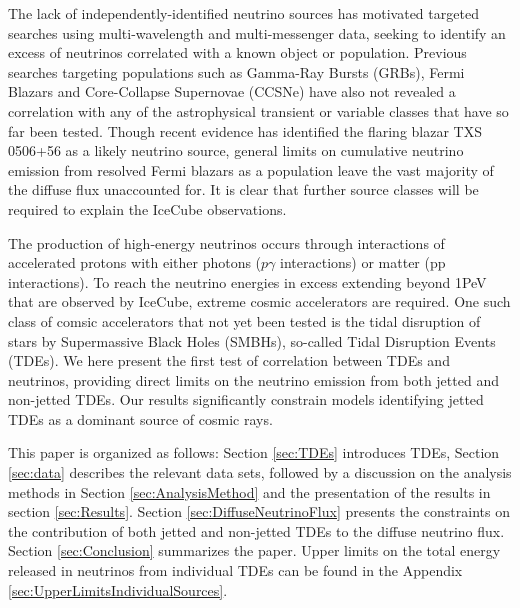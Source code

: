 \documentclass[twocolumn, tighten, linenumbers]{aastex62}
\begin{document}
The lack of independently-identified neutrino sources has motivated targeted searches using multi-wavelength and multi-messenger data, seeking to identify an excess of neutrinos correlated with a known object or population. Previous searches targeting populations such as Gamma-Ray Bursts (GRBs), Fermi Blazars and Core-Collapse Supernovae (CCSNe) have also not revealed a correlation with any of the astrophysical transient or variable classes that have so far been tested. Though recent evidence has identified the flaring blazar TXS 0506+56 as a likely neutrino source, general limits on cumulative neutrino emission from resolved Fermi blazars as a population leave the vast majority of the diffuse flux unaccounted for. It is clear that further source classes will be required to explain the IceCube observations.

The production of high-energy neutrinos occurs through interactions of accelerated protons with either photons ($p\gamma$ interactions) or matter (pp interactions). To reach the neutrino energies in excess extending beyond 1PeV that are observed by IceCube, extreme cosmic accelerators are required. One such class of comsic accelerators that not yet been tested is the tidal disruption of stars by Supermassive Black Holes (SMBHs), so-called Tidal Disruption Events (TDEs). We here present the first test of correlation between TDEs and neutrinos, providing direct limits on the neutrino emission from both jetted and non-jetted TDEs. Our results significantly constrain models identifying jetted TDEs as a dominant source of cosmic rays.

This paper is organized as follows: Section \ref{sec:TDEs} introduces TDEs,  Section \ref{sec:data} describes the relevant data sets, followed by a discussion on the analysis methods in Section \ref{sec:AnalysisMethod} and the presentation of the results in section \ref{sec:Results}. Section \ref{sec:DiffuseNeutrinoFlux} presents the constraints on the contribution of both jetted and non-jetted TDEs to the diffuse neutrino flux. Section \ref{sec:Conclusion} summarizes the paper. Upper limits on the total energy released in neutrinos from individual TDEs can be found in the Appendix \ref{sec:UpperLimitsIndividualSources}.
\end{document}
